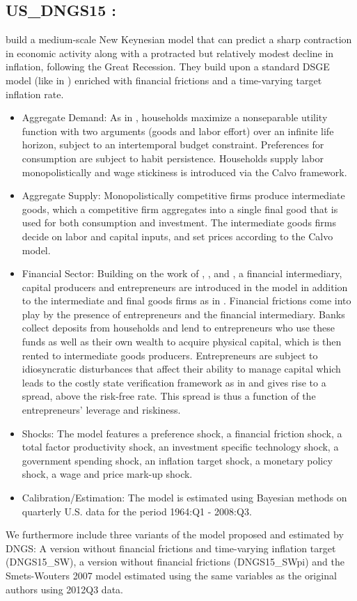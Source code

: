 \documentclass[11pt,a4paper]{article}
\begin{document}
	\subsection{US\_DNGS15 : \cite{del2015inflation}} 
	\label{USDNGS15}
	\cite{del2015inflation} build a medium-scale New Keynesian model that can predict a sharp contraction in economic activity along with a protracted but relatively modest decline in inflation, following the Great Recession. They build upon a standard DSGE model (like in \cite{SmetsWouters2007}) enriched
	with financial frictions and a time-varying target inflation rate.
	\begin{itemize}
		\item Aggregate Demand: As in \cite{SmetsWouters2007}, households maximize
		a nonseparable utility function with two arguments (goods and labor effort)
		over an infinite life horizon, subject to an intertemporal budget constraint.
		Preferences for consumption are subject to habit persistence. Households supply labor monopolistically and wage stickiness is introduced via the Calvo framework. 
		\item Aggregate Supply: Monopolistically competitive firms produce intermediate goods, which a competitive firm aggregates into a single final good that is used for both consumption and investment. The intermediate goods firms decide on labor and capital inputs, and set prices according to the Calvo model.
		\item Financial Sector: Building on the work of \cite{BernankeGertlerGilchrist1999}, \cite{CMR2014}, and \cite{DeGraeve2008}, a financial intermediary, capital producers and entrepreneurs are introduced in the model in addition to the intermediate and final goods firms as in \cite{SmetsWouters2007}. Financial frictions come into play by the presence of entrepreneurs and the financial intermediary. Banks collect deposits from households and lend to entrepreneurs who use these funds as well as their own wealth to acquire physical capital, which is then rented to intermediate goods producers.
		Entrepreneurs are subject to idiosyncratic disturbances that affect their ability to manage capital which leads to the costly state verification framework as in \cite{BernankeGertlerGilchrist1999} and gives rise to a spread, above the risk-free rate. This spread is thus a function of the entrepreneurs' leverage and riskiness.
		\item Shocks: The model features a preference shock, a financial friction shock, a total factor productivity shock, an investment specific technology shock, a government spending shock, an inflation target shock, a monetary policy shock, a wage and price mark-up shock.
		\item Calibration/Estimation: The model is estimated using Bayesian methods on
		quarterly U.S. data for the period 1964:Q1 - 2008:Q3.
	\end{itemize}
	We furthermore include three variants of the model proposed and estimated by DNGS: A version without financial frictions and time-varying inflation target (DNGS15\_SW), a version without financial frictions (DNGS15\_SWpi) and the Smets-Wouters 2007 model estimated using the same variables as the original authors using 2012Q3 data.
	
\end{document}
